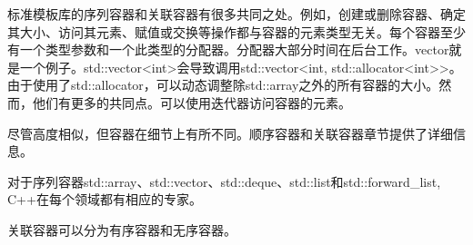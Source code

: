 

标准模板库的序列容器和关联容器有很多共同之处。例如，创建或删除容器、确定其大小、访问其元素、赋值或交换等操作都与容器的元素类型无关。每个容器至少有一个类型参数和一个此类型的分配器。分配器大部分时间在后台工作。vector就是一个例子。std::vector<int>会导致调用std::vector<int, std::allocator<int>{}>。由于使用了std::allocator，可以动态调整除std::array之外的所有容器的大小。然而，他们有更多的共同点。可以使用迭代器访问容器的元素。

尽管高度相似，但容器在细节上有所不同。顺序容器和关联容器章节提供了详细信息。

对于序列容器std::array、std::vector、std::deque、std::list和std::forward\_list, C++在每个领域都有相应的专家。

关联容器可以分为有序容器和无序容器。


















